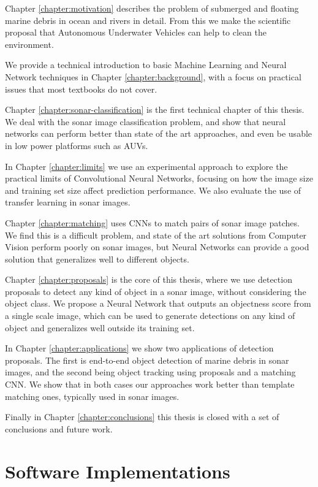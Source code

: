 Chapter \ref{chapter:motivation} describes the problem of submerged and floating marine debris in ocean and rivers in detail. From this we make the scientific proposal that Autonomous Underwater Vehicles can help to clean the environment.

We provide a technical introduction to basic Machine Learning and Neural Network techniques in Chapter \ref{chapter:background}, with a focus on practical issues that most textbooks do not cover.

Chapter \ref{chapter:sonar-classification} is the first technical chapter of this thesis. We deal with the sonar image classification problem, and show that neural networks can perform better than state of the art approaches, and even be usable in low power platforms such as AUVs.

In Chapter \ref{chapter:limits} we use an experimental approach to explore the practical limits of Convolutional Neural Networks, focusing on how the image size and training set size affect prediction performance. We also evaluate the use of transfer learning in sonar images.

Chapter \ref{chapter:matching} uses CNNs to match pairs of sonar image patches. We find this is a difficult problem, and state of the art solutions from Computer Vision perform poorly on sonar images, but Neural Networks can provide a good solution that generalizes well to different objects.

Chapter \ref{chapter:proposals} is the core of this thesis, where we use detection proposals to detect any kind of object in a sonar image, without considering the object class. We propose a Neural Network that outputs an objectness score from a single scale image, which can be used to generate detections on any kind of object and generalizes well outside its training set.

In Chapter \ref{chapter:applications} we show two applications of detection proposals. The first is end-to-end object detection of marine debris in sonar images, and the second being object tracking using proposals and a matching CNN. We show that in both cases our approaches work better than template matching ones, typically used in sonar images.

Finally in Chapter \ref{chapter:conclusions} this thesis is closed with a set of conclusions and future work.

\section{Software Implementations}

